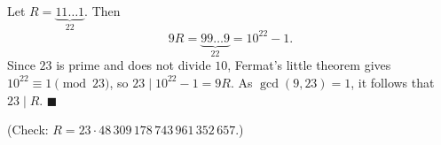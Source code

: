 Let $R=\underbrace{11\ldots1}_{22}$. Then
\[
9R=\underbrace{99\ldots9}_{22}=10^{22}-1 .
\]
Since $23$ is prime and does not divide $10$, Fermat's little theorem gives $10^{22}\equiv1\pmod{23}$, so $23\mid 10^{22}-1=9R$. As $\gcd(9,23)=1$, it follows that $23\mid R$. $\blacksquare$

(Check: $R=23\cdot48\,309\,178\,743\,961\,352\,657$.)
